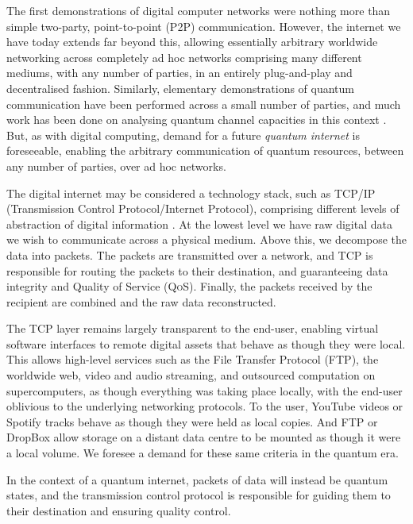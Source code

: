 \documentclass[aps, rmp, twocolumn, amsmath, amssymb, nofootinbib, superscriptaddress, longbibliography, floatfix, table-of-contents, eqsecnum]{revtex4-1}
\begin{document}
The first demonstrations of digital computer networks were nothing more than simple two-party, point-to-point (P2P) communication. However, the internet we have today extends far beyond this, allowing essentially arbitrary worldwide networking across completely ad hoc networks comprising many different mediums, with any number of parties, in an entirely plug-and-play and decentralised fashion. Similarly, elementary demonstrations of quantum communication have been performed across a small number of parties, and much work has been done on analysing quantum channel capacities in this context \cite{??? channel_capacity}. But, as with digital computing, demand for a future \textit{quantum internet} is foreseeable, enabling the arbitrary communication of quantum resources, between any number of parties, over ad hoc networks.

The digital internet may be considered a technology stack, such as TCP/IP (Transmission Control Protocol/Internet Protocol), comprising different levels of abstraction of digital information \cite{bib:TanenbaumNet}. At the lowest level we have raw digital data we wish to communicate across a physical medium. Above this, we decompose the data into packets. The packets are transmitted over a network, and TCP is responsible for routing the packets to their destination, and guaranteeing data integrity and Quality of Service (\textsc{QoS}). Finally, the packets received by the recipient are combined and the raw data reconstructed.

The TCP layer remains largely transparent to the end-user, enabling virtual software interfaces to remote digital assets that behave as though they were local. This allows high-level services such as the File Transfer Protocol (FTP), the worldwide web, video and audio streaming, and outsourced computation on supercomputers, as though everything was taking place locally, with the end-user oblivious to the underlying networking protocols. To the user, YouTube videos or Spotify tracks behave as though they were held as local copies. And FTP or DropBox allow storage on a distant data centre to be mounted as though it were a local volume. We foresee a demand for these same criteria in the quantum era.

In the context of a quantum internet, packets of data will instead be quantum states, and the transmission control protocol is responsible for guiding them to their destination and ensuring quality control.
\end{document}
